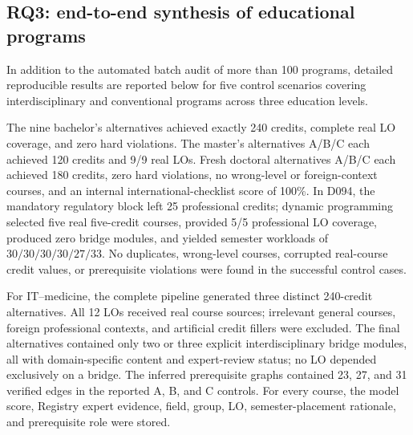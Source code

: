 \documentclass[twoside,11pt]{article}
\begin{document}
\subsection{RQ3: end-to-end synthesis of educational programs}

In addition to the automated batch audit of more than 100 programs, detailed reproducible results are reported below for five control scenarios covering interdisciplinary and conventional programs across three education levels.

\begin{table}[H]
\centering
\caption{Multi-level verification of the complete pipeline}
\label{tab:end-to-end-results-v2}
\scriptsize
{}
\end{table}

The nine bachelor's alternatives achieved exactly 240 credits, complete real LO coverage, and zero hard violations. The master's alternatives A/B/C each achieved 120 credits and 9/9 real LOs. Fresh doctoral alternatives A/B/C each achieved 180 credits, zero hard violations, no wrong-level or foreign-context courses, and an internal international-checklist score of 100\%. In D094, the mandatory regulatory block left 25 professional credits; dynamic programming selected five real five-credit courses, provided 5/5 professional LO coverage, produced zero bridge modules, and yielded semester workloads of $30/30/30/30/27/33$. No duplicates, wrong-level courses, corrupted real-course credit values, or prerequisite violations were found in the successful control cases.

For IT--medicine, the complete pipeline generated three distinct 240-credit alternatives. All 12 LOs received real course sources; irrelevant general courses, foreign professional contexts, and artificial credit fillers were excluded. The final alternatives contained only two or three explicit interdisciplinary bridge modules, all with domain-specific content and expert-review status; no LO depended exclusively on a bridge. The inferred prerequisite graphs contained 23, 27, and 31 verified edges in the reported A, B, and C controls. For every course, the model score, Registry expert evidence, field, group, LO, semester-placement rationale, and prerequisite role were stored.
\end{document}
